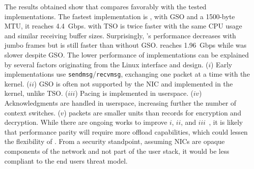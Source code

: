The results obtained show that \tcpls compares favorably with the tested \quic implementations. The fastest \quic implementation is \quicly, with GSO and a 1500-byte MTU, it reaches 4.4~Gbps. \tcpls with TSO is twice faster with the same CPU usage and similar receiving buffer sizes. Surprisingly, \quicly's performance decreases with jumbo frames but is still faster than without GSO.  \msquic reaches 1.96~Gbps while \mvfst was slower despite GSO.
The lower performance of \quic implementations can be explained by several
factors originating from the Linux \udp interface and \quic design.
($i$) Early \quic implementations use \texttt{sendmsg}/\texttt{recvmsg},
exchanging one packet at a time with the kernel.
($ii$) GSO is often not supported by the NIC and implemented in the kernel,
unlike TSO.
($iii$) Pacing is implemented in userspace.
($iv$) Acknowledgments are handled in userspace, increasing further the number
of context switches.
($v$) \quic packets are smaller units than \tls records for encryption and
decryption.
While there are ongoing works to improve $i$, $ii$, and $iii$~\cite{udp-gso-pacing}, it is likely that performance parity will require more offload capabilities, which could lessen the flexibility of \quic. From a security standpoint, assuming NICs are opaque components of the network and not part of the user stack, it would be less compliant to the end users threat model.


